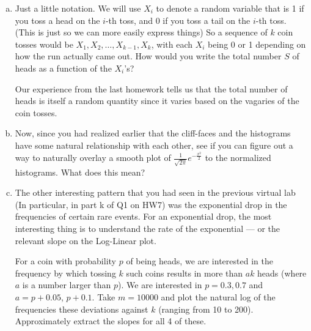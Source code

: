 \documentclass[]{article}
\newif\ifsolutions
\renewcommand{\answer}[1]{{\color{mydarkblue}\textbf{Solution:}#1}}
\begin{document}
\begin{qunlist}
\begin{enumerate}[a)]
\qpart
\item Just a little notation. We will use $X_i$ to denote a random
  variable that is 1 if you toss a head on the $i$-th toss, and 0 if you toss a
  tail on the $i$-th toss. (This is just so we can more easily express 
  things) So a sequence of $k$ coin tosses would be $X_1, X_2, \ldots,
  X_{k-1}, X_k$, with each $X_i$ being 0 or 1 depending on how the run
  actually came out. How would you write the total number $S$ of heads
  as a function of the $X_i$'s? 

 Our experience from the last homework tells us that the total number
 of heads is itself a random quantity since it varies based on the
 vagaries of the coin tosses.

\ifsolutions{ \answer { We can write $S$ as
\[ S = \sum_{i=1}^k X_i, \]
where the subscript $k$ denotes the number of coin flips.
}}\fi

\qpart 
\item Now, since you had realized earlier that the cliff-faces and the
  histograms have some natural relationship with each other, see if
  you can figure out a way to naturally overlay a smooth plot of
  $\frac{1}{\sqrt{2\pi}} e^{-\frac{x^2}{2}}$ to the normalized
  histograms. What does this mean?

\ifsolutions{ \answer { By normalizing the histograms so that the sum of the heights of all the columns equals 1, we can overlay the function above very nicely. This suggests that integrating these histograms will yield the cliff-face shapes plotted above. It also suggests that the probability of getting certain numbers of heads is related to the normal distribution.
\begin{figure}[h!]
\center
\texttt{[image: figs/part\_c.png]}
\end{figure}
}}\fi

\qpart
\item The other interesting pattern that you had seen in the previous
  virtual lab (In particular, in part k of Q1 on HW7) was the
  exponential drop in the frequencies of certain rare events. For an
  exponential drop, the most interesting thing is to understand the
  rate of the exponential --- or the relevant slope on the Log-Linear
  plot.  

  For a coin with probability $p$ of being heads, we are interested in
  the frequency by which tossing $k$ such coins results in more than
  $ak$ heads (where $a$ is a number larger than $p$). We are
  interested in $p=0.3,0.7$ and $a = p+0.05$,
  $p+0.1$.  Take $m = 10000$ and plot the natural log of the frequencies 
  these deviations against $k$ (ranging from 10 to 200). Approximately
  extract the slopes for all 4 of these.


\end{enumerate}
\end{qunlist}
\end{document}
